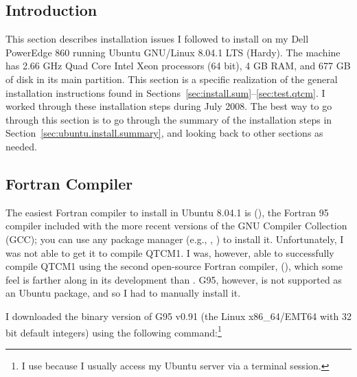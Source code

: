 %


%
\subsection{Introduction}

This section describes installation issues 
I followed to install  on my
Dell PowerEdge 860 running Ubuntu GNU/Linux 8.04.1 LTS (Hardy).
The machine has 2.66 GHz Quad Core Intel Xeon processors (64 bit),
4 GB RAM, and 677 GB of disk in its main partition.
This section is a specific realization of the general installation
instructions found in Sections~\ref{sec:install.sum}--\ref{sec:test.qtcm}.
I worked through these installation steps during July 2008.
The best way to go through this section is to go through
the summary of the installation steps in 
Section~\ref{sec:ubuntu.install.summary},
and looking back to other sections as needed.



\subsection{Fortran Compiler}     \label{sec:ubuntu.fort.install}

The easiest Fortran compiler to install in Ubuntu 8.04.1 is
(), the Fortran 95 compiler included with the more
recent versions of the GNU Compiler Collection (GCC); you can
use any package manager (e.g., , )
to install it.
Unfortunately, I was not able to get it to compile QTCM1.
I was, however, able to successfully compile QTCM1 using
the second open-source Fortran compiler,
 (),
which some feel is farther along in its development than .
G95, however, is not supported as an Ubuntu package, and so I had
to manually install it.

I downloaded the binary version of G95 v0.91 
(the Linux x86\_64/EMT64 with 32 bit default integers) 
using the following
 command:\footnote%
	{I use  because I usually access my
	Ubuntu server via a terminal session.}

